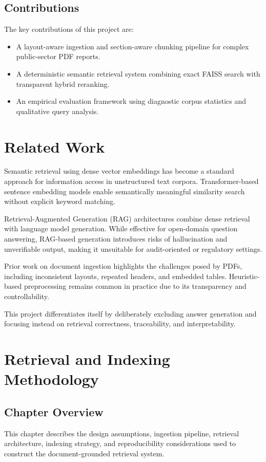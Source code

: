 \documentclass[12pt,a4paper]{report}
\begin{document}
\section{Contributions}
The key contributions of this project are:
\begin{itemize}
  \item A layout-aware ingestion and section-aware chunking pipeline for complex public-sector PDF reports.
  \item A deterministic semantic retrieval system combining exact FAISS search with transparent hybrid reranking.
  \item An empirical evaluation framework using diagnostic corpus statistics and qualitative query analysis.
\end{itemize}

\chapter{Related Work}

Semantic retrieval using dense vector embeddings has become a standard approach for information access in unstructured text corpora. Transformer-based sentence embedding models enable semantically meaningful similarity search without explicit keyword matching.

Retrieval-Augmented Generation (RAG) architectures combine dense retrieval with language model generation. While effective for open-domain question answering, RAG-based generation introduces risks of hallucination and unverifiable output, making it unsuitable for audit-oriented or regulatory settings.

Prior work on document ingestion highlights the challenges posed by PDFs, including inconsistent layouts, repeated headers, and embedded tables. Heuristic-based preprocessing remains common in practice due to its transparency and controllability.

This project differentiates itself by deliberately excluding answer generation and focusing instead on retrieval correctness, traceability, and interpretability.

\chapter{Retrieval and Indexing Methodology}

\section{Chapter Overview}
This chapter describes the design assumptions, ingestion pipeline, retrieval architecture, indexing strategy, and reproducibility considerations used to construct the document-grounded retrieval system.
\end{document}
